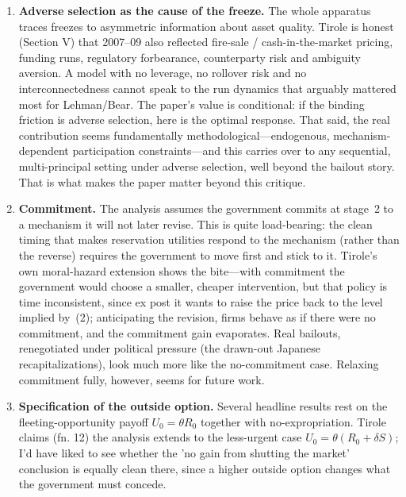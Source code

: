 \documentclass[11pt]{article}
\theoremstyle{definition}
\theoremstyle{plain}
\begin{document}
\begin{enumerate}[leftmargin=1.6em]
  \item \textbf{Adverse selection as the cause of the freeze.} The whole
  apparatus traces freezes to asymmetric information about asset quality. Tirole
  is honest (Section V) that 2007--09 also reflected fire-sale / cash-in-the-market
  pricing, funding runs, regulatory forbearance, counterparty risk and ambiguity
  aversion. A model with no leverage, no rollover risk and no interconnectedness
  cannot speak to the run dynamics that arguably mattered most for Lehman/Bear.
  The paper's value is conditional: if the binding friction is adverse
  selection, here is the optimal response. That said, the real contribution seems fundamentally
  methodological---endogenous, mechanism-dependent participation constraints---and
  this carries over to any sequential, multi-principal setting under adverse
  selection, well beyond the bailout story. That is what makes the paper matter beyond this critique.

\item \textbf{Commitment.} The analysis assumes the government commits at stage~2
  to a mechanism it will not later revise. This is quite load-bearing: the clean timing
  that makes reservation utilities respond to the mechanism (rather than the
  reverse) requires the government to move first and stick to it. Tirole's own
  moral-hazard extension shows the bite---with commitment the government would
  choose a smaller, cheaper intervention, but that policy is time
  inconsistent, since ex post it wants to raise the price back to the level implied
  by~(2); anticipating the revision, firms behave as if there were no commitment,
  and the commitment gain evaporates. Real bailouts, renegotiated under political
  pressure (the drawn-out Japanese recapitalizations), look much more like the
  no-commitment case. Relaxing commitment fully, however, seems for future work.

\item \textbf{Specification of the outside option.} Several headline results rest on the fleeting-opportunity payoff $U_{0}=\theta R_{0}$ together with no-expropriation. Tirole claims (fn. 12) the analysis extends to the less-urgent case $U_{0}=\theta(R_{0}+\delta S)$; I'd have liked to see whether the 'no gain from shutting the market' conclusion is equally clean there, since a higher outside option changes what the government must concede.


\end{enumerate}
\end{document}
